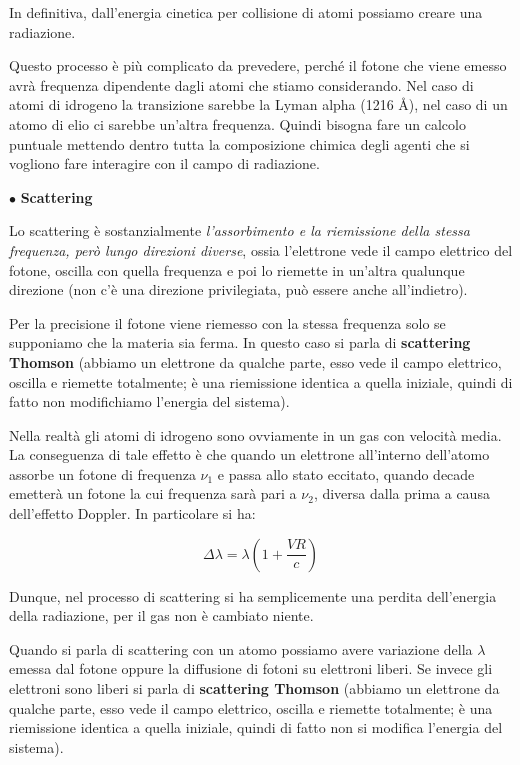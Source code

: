 In definitiva, dall'energia cinetica per collisione di atomi possiamo creare una radiazione.

Questo processo è più complicato da prevedere, perché il fotone che viene emesso avrà frequenza dipendente dagli atomi che stiamo considerando. Nel caso di atomi di idrogeno la transizione sarebbe la Lyman alpha (1216 Å), nel caso di un atomo di elio ci sarebbe un'altra frequenza. Quindi bisogna fare un calcolo puntuale mettendo dentro tutta la composizione chimica degli agenti che si vogliono fare interagire con il campo di radiazione.

\vspace{0.2cm}$\bullet$ \textbf{Scattering}

\vspace{0.2cm}Lo scattering è sostanzialmente \textit{l'assorbimento e la riemissione della stessa frequenza, però lungo direzioni diverse}, ossia l'elettrone vede il campo elettrico del fotone, oscilla con quella frequenza e poi lo riemette in un'altra qualunque direzione (non c'è una direzione privilegiata, può essere anche all'indietro).

Per la precisione il fotone viene riemesso con la stessa frequenza solo se supponiamo che la materia sia ferma. In questo caso si parla di \textbf{scattering Thomson} (abbiamo un elettrone da qualche parte, esso vede il campo elettrico, oscilla e riemette totalmente; è una riemissione identica a quella iniziale, quindi di fatto non modifichiamo l'energia del sistema).

Nella realtà gli atomi di idrogeno sono ovviamente in un gas con velocità media. La conseguenza di tale effetto è che quando un elettrone all'interno dell'atomo assorbe un fotone di frequenza $\nu_1$ e passa allo stato eccitato, quando decade emetterà un fotone la cui frequenza sarà pari a $\nu_2$, diversa dalla prima a causa dell'effetto Doppler. In particolare si ha:

\begin{equation}
  \Delta\lambda=\lambda \left(1 + \frac{VR}{c}\right)
\end{equation}

Dunque, nel processo di scattering si ha semplicemente una perdita dell'energia della radiazione, per il gas non è cambiato niente.

Quando si parla di scattering con un atomo possiamo avere variazione della $\lambda$ emessa dal fotone oppure la diffusione di fotoni su elettroni liberi. Se invece gli elettroni sono liberi si parla di \textbf{scattering Thomson} (abbiamo un elettrone da qualche parte, esso vede il campo elettrico, oscilla e riemette totalmente; è una riemissione identica a quella iniziale, quindi di fatto non si modifica l'energia del sistema).

